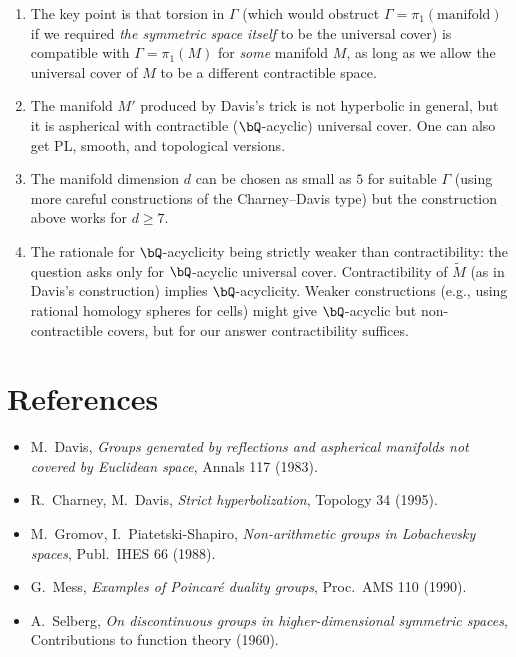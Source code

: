 \begin{enumerate}
\item The key point is that torsion in $\Gamma$ (which would obstruct $\Gamma = \pi_1(\text{manifold})$ if we required \emph{the symmetric space itself} to be the universal cover) is compatible with $\Gamma = \pi_1(M)$ for \emph{some} manifold $M$, as long as we allow the universal cover of $M$ to be a different contractible space.
\item The manifold $M'$ produced by Davis's trick is not hyperbolic in general, but it is aspherical with contractible ($\bQ$-acyclic) universal cover. One can also get PL, smooth, and topological versions.
\item The manifold dimension $d$ can be chosen as small as $5$ for suitable $\Gamma$ (using more careful constructions of the Charney--Davis type) but the construction above works for $d\geq 7$.
\item The rationale for $\bQ$-acyclicity being strictly weaker than contractibility: the question asks only for $\bQ$-acyclic universal cover. Contractibility of $\widetilde M$ (as in Davis's construction) implies $\bQ$-acyclicity. Weaker constructions (e.g., using rational homology spheres for cells) might give $\bQ$-acyclic but non-contractible covers, but for our answer contractibility suffices.
\end{enumerate}

\section*{References}
\begin{itemize}\setlength\itemsep{0.2em}
\item M.~Davis, \emph{Groups generated by reflections and aspherical manifolds not covered by Euclidean space}, Annals 117 (1983).
\item R.~Charney, M.~Davis, \emph{Strict hyperbolization}, Topology 34 (1995).
\item M.~Gromov, I.~Piatetski-Shapiro, \emph{Non-arithmetic groups in Lobachevsky spaces}, Publ.\ IHES 66 (1988).
\item G.~Mess, \emph{Examples of Poincaré duality groups}, Proc.\ AMS 110 (1990).
\item A.~Selberg, \emph{On discontinuous groups in higher-dimensional symmetric spaces}, Contributions to function theory (1960).
\end{itemize}


